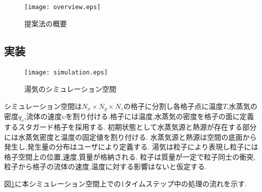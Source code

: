 \documentclass[submit,techrep]{ipsj}
\begin{document}
\begin{figure}[th]
\centering
\texttt{[image: overview.eps]}
\caption{提案法の概要}
\label{overview}
\end{figure}
\subsection{実装}

\begin{figure}[bh]
\texttt{[image: simulation.eps]}
\caption{湯気のシミュレーション空間}
\label{simulation}
\end{figure}



シミュレーション空間は$N_{x} \times N_{y} \times N_{z}$の格子に分割し各格子点に温度$T$,水蒸気の密度$q_{v}$,流体の速度$\upsilon$を割り付ける.格子には温度,水蒸気の密度を格子の面に定義するスタガード格子を採用する.
初期状態として水蒸気源と熱源が存在する部分には水蒸気密度と温度の固定値を割り付ける.
水蒸気源と熱源は空間の底面から発生し,発生量の分布はユーザにより定義する.
湯気は粒子により表現し粒子には格子空間上の位置,速度,質量が格納される.
粒子は質量が一定で粒子同士の衝突,粒子から格子の流体の速度,温度に対する影響はないと仮定する.

図\ref{overview}に本シミュレーション空間上での1タイムステップ中の処理の流れを示す.
\end{document}
